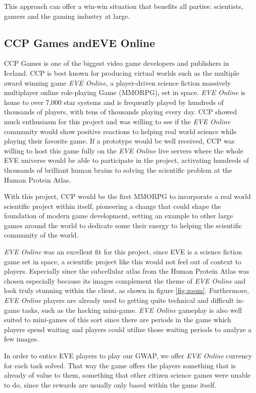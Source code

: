 This approach can offer a win-win situation that benefits all parties: scientists, gamers and the gaming industry at large.

\subsection{CCP Games andEVE Online}

CCP Games \cite{CCP} is one of the biggest video game developers and publishers in Iceland. CCP is best known for producing virtual worlds such as the multiple award winning game \emph{EVE Online}, a player-driven science fiction massively multiplayer online role-playing Game (MMORPG), set in space. \emph{EVE Online} is home to over 7,000 star systems and is frequently played by hundreds of thousands of players, with tens of thousands playing every day. CCP showed much enthusiasm for this project and was willing to see if the \emph{EVE Online} community would show positive reactions to helping real world science while playing their favorite game. If a prototype would be well received, CCP was willing to host this game fully on the \emph{EVE Online} live servers where the whole EVE universe would be able to participate in the project, activating hundreds of thousands of brilliant human brains to solving the scientific problem at the Human Protein Atlas.

With this project, CCP would be the first MMORPG to incorporate a real world scientific project within itself, pioneering a change that could shape the foundation of modern game development, setting an example to other large games around the world to dedicate some their energy to helping the scientific community of the world.

\emph{EVE Online} was an excellent fit for this project, since EVE is a science fiction game set in space, a scientific project like this would not feel out of context to players. Especially since the subcellular atlas from the Human Protein Atlas was chosen especially because its images complement the theme of \emph{EVE Online} and look truly stunning within the client, as shown in figure \ref{fig:zoom}. Furthermore, \emph{EVE Online} players are already used to getting quite technical and difficult in-game tasks, such as the hacking mini-game. \emph{EVE Online} gameplay is also well suited to mini-games of this sort since there are periods in the game which players spend waiting and players could utilize those waiting periods to analyze a few images.

In order to entice EVE players to play our GWAP, we offer \emph{EVE Online} currency for each task solved. That way the game offers the players something that is already of value to them, something that other citizen science games were unable to do, since the rewards are usually only based within the game itself.

